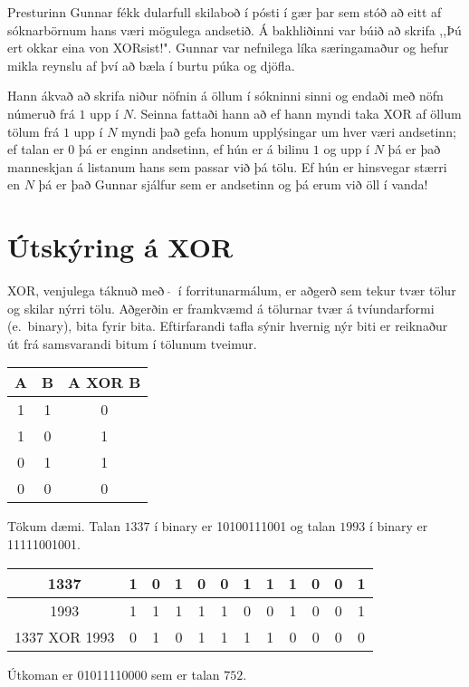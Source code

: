 
Presturinn Gunnar fékk dularfull skilaboð í pósti í gær þar sem stóð að eitt af 
sóknarbörnum hans væri mögulega andsetið. Á bakhliðinni var búið að skrifa
,,Þú ert okkar eina von XORsist!". Gunnar var nefnilega líka særingamaður 
og hefur mikla reynslu af því að bæla í burtu púka og djöfla.

Hann ákvað að skrifa niður nöfnin á öllum í sókninni sinni og endaði með nöfn
númeruð frá $1$ upp í $N$. Seinna fattaði hann að ef hann myndi taka XOR af öllum tölum frá
$1$ upp í $N$ myndi það gefa honum upplýsingar um hver væri andsetinn; ef talan er $0$ þá er enginn
andsetinn, ef hún er á bilinu $1$ og upp í $N$ þá er það manneskjan á listanum hans sem
passar við þá tölu. Ef hún er hinsvegar stærri en $N$ þá er það Gunnar sjálfur sem er
andsetinn og þá erum við öll í vanda! 


\section*{Útskýring á XOR}
XOR, venjulega táknuð með $~\hat{}~$ í forritunarmálum, er aðgerð sem tekur tvær
tölur og skilar nýrri tölu. Aðgerðin er framkvæmd á tölurnar tvær á
tvíundarformi (e.\ binary), bita fyrir bita. Eftirfarandi tafla sýnir hvernig
nýr biti er reiknaður út frá samsvarandi bitum í tölunum tveimur.
\begin{center}
\begin{tabular}{|c|c|c|}
\hline
A & B & A XOR B \\ \hline
1 & 1 & 0 \\ \hline
1 & 0 & 1 \\ \hline
0 & 1 & 1 \\ \hline
0 & 0 & 0 \\ \hline
\end{tabular}
\end{center}

Tökum dæmi. Talan $1337$ í binary er 10100111001 og talan $1993$ í binary er 11111001001.
\begin{center}
\begin{tabular}{|c|ccccccccccc|}
\hline
1337 & 1 & 0 & 1 & 0 & 0 & 1 & 1 & 1 & 0 & 0 & 1\\ \hline
1993 & 1 & 1 & 1 & 1 & 1 & 0 & 0 & 1 & 0 & 0 & 1 \\ \hline
1337 XOR 1993 & 0 & 1 & 0 & 1 & 1 & 1 & 1 & 0 & 0 & 0 & 0 \\ \hline
\end{tabular}
\end{center}
Útkoman er 01011110000 sem er talan $752$.

